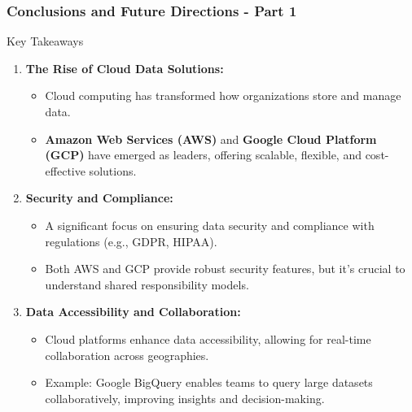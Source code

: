 \documentclass[aspectratio=169]{beamer}
\begin{document}
\begin{frame}[fragile]
    \frametitle{Conclusions and Future Directions - Part 1}
    \begin{block}{Key Takeaways}
        \begin{enumerate}
            \item \textbf{The Rise of Cloud Data Solutions:}
            \begin{itemize}
                \item Cloud computing has transformed how organizations store and manage data.
                \item \textbf{Amazon Web Services (AWS)} and \textbf{Google Cloud Platform (GCP)} have emerged as leaders, offering scalable, flexible, and cost-effective solutions.
            \end{itemize}

            \item \textbf{Security and Compliance:}
            \begin{itemize}
                \item A significant focus on ensuring data security and compliance with regulations (e.g., GDPR, HIPAA).
                \item Both AWS and GCP provide robust security features, but it's crucial to understand shared responsibility models.
            \end{itemize}

            \item \textbf{Data Accessibility and Collaboration:}
            \begin{itemize}
                \item Cloud platforms enhance data accessibility, allowing for real-time collaboration across geographies.
                \item Example: Google BigQuery enables teams to query large datasets collaboratively, improving insights and decision-making.
            \end{itemize}
        \end{enumerate}
    \end{block}
\end{frame}
\end{document}
